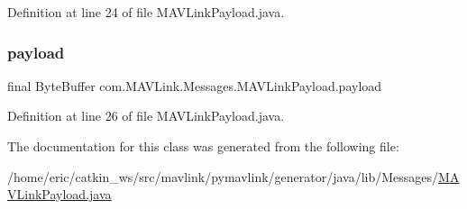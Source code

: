 Definition at line 24 of file M\+A\+V\+Link\+Payload.\+java.

\mbox{\label{classcom_1_1MAVLink_1_1Messages_1_1MAVLinkPayload_ad41fcde73cb0645d22f6b7af0539ffae}} 
\subsubsection{\texorpdfstring{payload}{payload}}
{\footnotesize\ttfamily final Byte\+Buffer com.\+M\+A\+V\+Link.\+Messages.\+M\+A\+V\+Link\+Payload.\+payload}



Definition at line 26 of file M\+A\+V\+Link\+Payload.\+java.



The documentation for this class was generated from the following file\+:\begin{DoxyCompactItemize}
\item 
/home/eric/catkin\+\_\+ws/src/mavlink/pymavlink/generator/java/lib/\+Messages/\mbox{\hyperlink{MAVLinkPayload_8java}{M\+A\+V\+Link\+Payload.\+java}}\end{DoxyCompactItemize}
